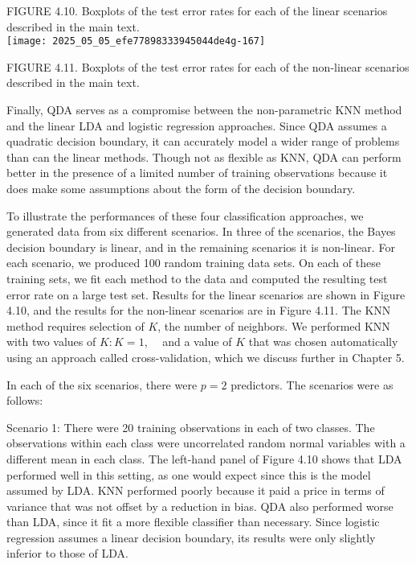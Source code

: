 \documentclass[10pt]{article}
\begin{document}
FIGURE 4.10. Boxplots of the test error rates for each of the linear scenarios described in the main text.\\
\texttt{[image: 2025\_05\_05\_efe77898333945044de4g-167]}

FIGURE 4.11. Boxplots of the test error rates for each of the non-linear scenarios described in the main text.

Finally, QDA serves as a compromise between the non-parametric KNN method and the linear LDA and logistic regression approaches. Since QDA assumes a quadratic decision boundary, it can accurately model a wider range of problems than can the linear methods. Though not as flexible as KNN, QDA can perform better in the presence of a limited number of training observations because it does make some assumptions about the form of the decision boundary.

To illustrate the performances of these four classification approaches, we generated data from six different scenarios. In three of the scenarios, the Bayes decision boundary is linear, and in the remaining scenarios it is non-linear. For each scenario, we produced 100 random training data sets. On each of these training sets, we fit each method to the data and computed the resulting test error rate on a large test set. Results for the linear scenarios are shown in Figure 4.10, and the results for the non-linear scenarios are in Figure 4.11. The KNN method requires selection of $K$, the number of neighbors. We performed KNN with two values of $K: K=1$,\
\
and a value of $K$ that was chosen automatically using an approach called cross-validation, which we discuss further in Chapter 5.

In each of the six scenarios, there were $p=2$ predictors. The scenarios were as follows:

Scenario 1: There were 20 training observations in each of two classes. The observations within each class were uncorrelated random normal variables with a different mean in each class. The left-hand panel of Figure 4.10 shows that LDA performed well in this setting, as one would expect since this is the model assumed by LDA. KNN performed poorly because it paid a price in terms of variance that was not offset by a reduction in bias. QDA also performed worse than LDA, since it fit a more flexible classifier than necessary. Since logistic regression assumes a linear decision boundary, its results were only slightly inferior to those of LDA.
\end{document}

